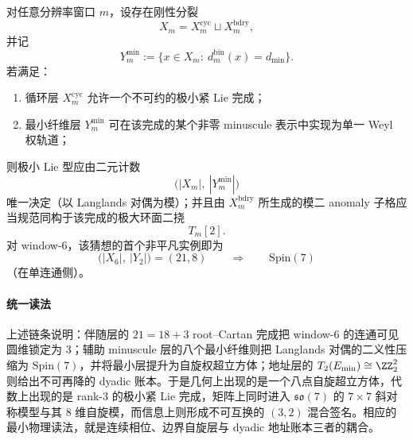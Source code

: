 \begin{conjecture}\label{conj:conclusion-minuscule-boundary-rigidity}
对任意分辨率窗口 \(m\)，设存在刚性分裂
\[
X_m=X_m^{\mathrm{cyc}}\sqcup X_m^{\mathrm{bdry}},
\]
并记
\[
Y_m^{\min}:=\{x\in X_m:\ d_m^{\mathrm{bin}}(x)=d_{\min}\}.
\]
若满足：
\begin{enumerate}
  \item 循环层 \(X_m^{\mathrm{cyc}}\) 允许一个不可约的极小紧 Lie 完成；
  \item 最小纤维层 \(Y_m^{\min}\) 可在该完成的某个非零 minuscule 表示中实现为单一 Weyl 权轨道；
\end{enumerate}
则极小 Lie 型应由二元计数
\[
\bigl(|X_m|,\ |Y_m^{\min}|\bigr)
\]
唯一决定（以 Langlands 对偶为模）；并且由 \(X_m^{\mathrm{bdry}}\) 所生成的模二 anomaly 子格应当规范同构于该完成的极大环面二挠
\[
T_m[2].
\]
对 window-\(6\)，该猜想的首个非平凡实例即为
\[
\bigl(|X_6|,\ |Y_2|\bigr)=(21,8)
\qquad\Longrightarrow\qquad
\mathrm{Spin}(7)
\]
（在单连通侧）。
\end{conjecture}

\paragraph{统一读法}
上述链条说明：伴随层的 \(21=18+3\) root--Cartan 完成把 window-\(6\) 的连通可见圆维锁定为 \(3\)；辅助 minuscule 层的八个最小纤维则把 Langlands 对偶的二义性压缩为 \(\mathrm{Spin}(7)\)，并将最小层提升为自旋权超立方体；地址层的 \(T_2(E_{\min})\cong \ZZ_2^2\) 则给出不可再降的 dyadic 账本。于是几何上出现的是一个八点自旋超立方体，代数上出现的是 rank-\(3\) 的极小紧 Lie 完成，矩阵上同时进入 \(\mathfrak{so}(7)\) 的 \(7\times 7\) 斜对称模型与其 \(8\) 维自旋模，而信息上则形成不可互换的 \((3,2)\) 混合签名。相应的最小物理读法，就是连续相位、边界自旋层与 dyadic 地址账本三者的耦合。

\endinput
